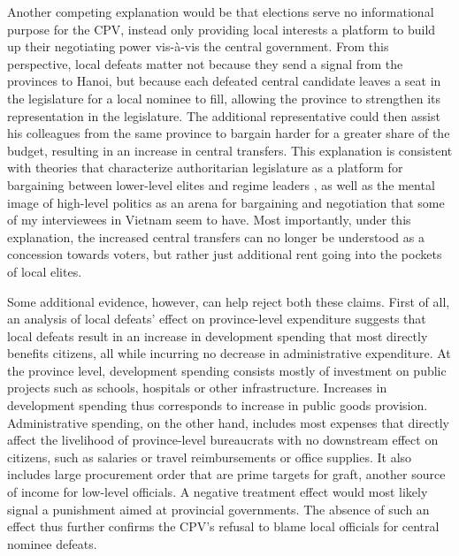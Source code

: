 \documentclass[12pt]{article}
\newcommand{\1}{\mathbbm{1}}
\begin{document}
Another competing explanation would be that elections serve no informational purpose for the CPV, instead only providing local interests a platform to build up their negotiating power vis-\`{a}-vis the central government. From this perspective, local defeats matter not because they send a signal from the provinces to Hanoi, but because each defeated central candidate leaves a seat in the legislature for a local nominee to fill, allowing the province to strengthen its representation in the legislature. The additional representative could then assist his colleagues from the same province to bargain harder for a greater share of the budget, resulting in an increase in central transfers. This explanation is consistent with theories that characterize authoritarian legislature as a platform for bargaining between lower-level elites and regime leaders \citep[e.g.][]{Magaloni2008}, as well as the mental image of high-level politics as an arena for bargaining and negotiation that some of my interviewees in Vietnam seem to have. Most importantly, under this explanation, the increased central transfers can no longer be understood as a concession towards voters, but rather just additional rent going into the pockets of local elites.

Some additional evidence, however, can help reject both these claims. First of all, an analysis of local defeats' effect on province-level expenditure suggests that local defeats result in an increase in development spending that most directly benefits citizens, all while incurring no decrease in administrative expenditure. At the province level, development spending consists mostly of investment on public projects such as schools, hospitals or other infrastructure. Increases in development spending thus corresponds to increase in public goods provision. Administrative spending, on the other hand, includes most expenses that directly affect the livelihood of province-level bureaucrats with no downstream effect on citizens, such as salaries or travel reimbursements or office supplies. It also includes large procurement order that are prime targets for graft, another source of income for low-level officials. A negative treatment effect would most likely signal a punishment aimed at provincial governments. The absence of such an effect thus further confirms the CPV's refusal to blame local officials for central nominee defeats.
\end{document}

